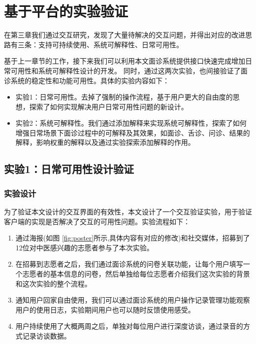 \chapter{基于平台的实验验证}

在第三章我们通过交互研究，发现了大量待解决的交互问题，并得出对应的改进思路有三条：支持可持续使用、系统可解释性、日常可用性。

基于上一章节的工作，接下来我们可以利用本文面诊系统提供接口快速完成增加日常可用性和系统可解释性设计的开发。
同时，通过这两次实验，也间接验证了面诊系统的稳定性和功能可用性。具体的实验内容如下：

\begin{itemize}
	\item 实验1：日常可用性。去掉了强制的操作流程，基于用户更大的自由度的思想，探索了如何实现解决用户日常可用性问题的新设计。

	\item 实验2：系统可解释性。我们通过添加解释来实现系统可解释性，探索了如何增强日常场景下面诊过程中的可解释及其效果，如面诊、舌诊、问诊、结果的解释，影响权重的解释以及通过实验探索添加解释的作用。
	
\end{itemize}


\section{实验1：日常可用性设计验证}



\subsection{实验设计}
为了验证本文设计的交互界面的有效性，本文设计了一个交互验证实验，用于验证客户端的实现是否解决了交互的可用性问题。实验流程如下：
\begin{enumerate}


    \item 通过海报(如图 \ref{fig:poster}所示,具体内容有对应的修改)和社交媒体，招募到了12位对中医感兴趣的志愿者参与了本次实验。

    \item 在招募到志愿者之后，我们通过面诊系统的问卷关联功能，让每个用户填写一个志愿者的基本信息的问卷，然后单独给每位志愿者介绍我们这次实验的背景和这次实验的整个流程。

    \item 通知用户回家自由使用，我们可以通过面诊系统的用户操作记录管理功能观察用户的使用日志，实验期间用户也可以随时反馈使用感受。

    \item 用户持续使用了大概两周之后，单独对每位用户进行深度访谈，通过录音的方式记录访谈数据。

\end{enumerate}

